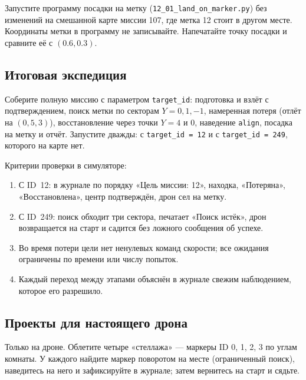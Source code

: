 \begin{taskbox}
Запустите программу посадки на метку (\texttt{12\_01\_land\_on\_marker.py}) без изменений на смешанной карте миссии 107, где метка 12 стоит в другом месте. Координаты метки в программу не записывайте. Напечатайте точку посадки и сравните её с $(0.6, 0.3)$.
\end{taskbox}

\subsection{Итоговая экспедиция}

\begin{taskbox}
Соберите полную миссию с параметром \verb|target_id|: подготовка и взлёт с подтверждением, поиск метки по секторам $Y = 0, 1, -1$, намеренная потеря (отлёт на $(0, 5, 3)$), восстановление через точки $Y = 4$ и $0$, наведение \verb|align|, посадка на метку и отчёт. Запустите дважды: с \verb|target_id = 12| и с \verb|target_id = 249|, которого на карте нет.

Критерии проверки в симуляторе:
\begin{enumerate}
    \item С ID~12: в журнале по порядку «Цель миссии: 12», находка, «Потеряна», «Восстановлена», центр подтверждён, дрон сел на метку.
    \item С ID~249: поиск обходит три сектора, печатает «Поиск истёк», дрон возвращается на старт и садится без ложного сообщения об успехе.
    \item Во время потери цели нет ненулевых команд скорости; все ожидания ограничены по времени или числу попыток.
    \item Каждый переход между этапами объяснён в журнале свежим наблюдением, которое его разрешило.
\end{enumerate}
\end{taskbox}

\subsection{Проекты для настоящего дрона}

\begin{taskbox}
Только на дроне. Облетите четыре «стеллажа» --- маркеры ID 0, 1, 2, 3 по углам комнаты. У каждого найдите маркер поворотом на месте (ограниченный поиск), наведитесь на него и зафиксируйте в журнале; затем вернитесь на старт и сядьте.
\end{taskbox}

